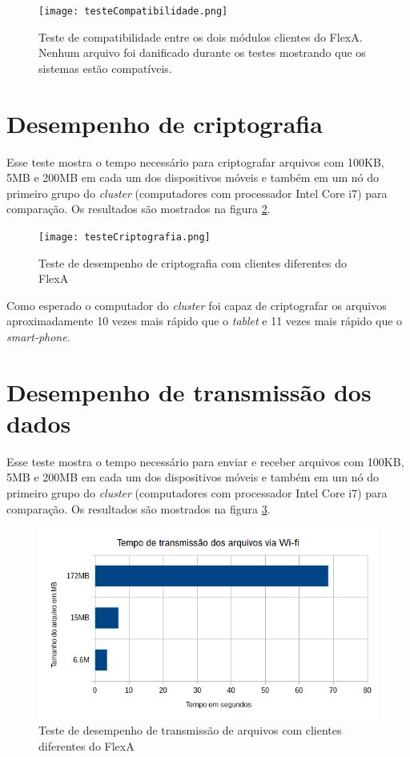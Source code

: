     \begin{figure}[!ht]
    \centering
    \texttt{[image: testeCompatibilidade.png]}
    \caption{Teste de compatibilidade entre os dois módulos clientes do FlexA. Nenhum arquivo foi danificado durante os testes mostrando que os sistemas estão compatíveis.}
    \label{fig:testeCompatibilidade}
    \end{figure}
    
\section{Desempenho de criptografia}

    Esse teste mostra o tempo necessário para criptografar arquivos com 100KB, 5MB e 200MB em cada um dos dispositivos móveis e também em um nó do primeiro grupo do \textit{cluster} (computadores com processador Intel Core i7) para comparação. Os resultados são mostrados na figura \ref{fig:testesCriptografia}.
    
    \begin{figure}[!ht]
    \centering
    \texttt{[image: testeCriptografia.png]}
    \caption{Teste de desempenho de criptografia com clientes diferentes do FlexA}
    \label{fig:testesCriptografia}
    \end{figure}
    
    Como esperado o computador do \textit{cluster} foi capaz de criptografar os arquivos aproximadamente 10 vezes mais rápido que o \textit{tablet} e 11 vezes mais rápido que o \textit{smart-phone}.
    
\section{Desempenho de transmissão dos dados}

    Esse teste mostra o tempo necessário para enviar e receber arquivos com 100KB, 5MB e 200MB em cada um dos dispositivos móveis e também em um nó do primeiro grupo do \textit{cluster} (computadores com processador Intel Core i7) para comparação. Os resultados são mostrados na figura \ref{fig:testeTransmissao}.
    
    \begin{figure}[!ht]
    \centering
    \includegraphics[width=14cm]{testeTransmissao.png}
    \caption{Teste de desempenho de transmissão de arquivos com clientes diferentes do FlexA}
    \label{fig:testeTransmissao}
    \end{figure}
    
